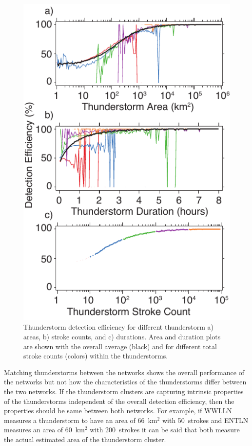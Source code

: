 \begin{figure}[ht!]
   \centering
   \includegraphics[scale=1]{thunderstorm/Figures/deParameter.pdf}
   \caption{Thunderstorm detection efficiency for different thunderstorm a) areas, b) stroke counts, and c) durations.
           Area and duration plots are shown with the overall average (black) and for different total stroke counts (colors) within the thunderstorms.}
   \label{deParameter}
\end{figure}

Matching thunderstorms between the networks shows the overall performance of the networks but not how the characteristics of the thunderstorms differ between the two networks.
If the thunderstorm clusters are capturing intrinsic properties of the thunderstorms independent of the overall detection efficiency, then the properties should be same between both networks.
For example, if WWLLN measures a thunderstorm to have an area of 66~km$^2$ with 50~strokes and ENTLN measures an area of 60~km$^2$ with 200~strokes it can be said that both measure the actual estimated area of the thunderstorm cluster.


